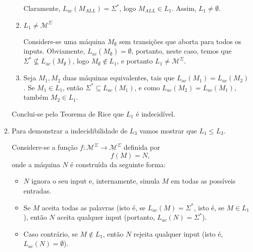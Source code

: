 \documentclass[a4paper,12pt]{article}
\begin{document}
\begin{enumerate}[label=\alph*)]
\begin{enumerate}[label=\arabic*)]
\begin{center}
    \end{center}

    Claramente, $L_{ac}(M_{ALL}) = \Sigma^*$, logo $M_{ALL} \in L_1$. Assim, $L_1 \neq \emptyset$.

    \vspace{0.3cm}
    \item \underline{$L_1 \neq \mathcal{M}^\Sigma$}

    Considere-se uma máquina $M_{\emptyset}$ sem transições que aborta para todos os inputs. Obviamente, $L_{ac}(M_{\emptyset}) = \emptyset$, portanto, neste caso, temos que $\Sigma^* \nsubseteq L_{ac}(M_{\emptyset})$, logo $M_{\emptyset} \notin L_1$, e portanto $L_1 \neq \mathcal{M}^\Sigma$.

    \vspace{0.3cm}
    \item Seja $M_1, M_2$ duas máquinas equivalentes, tais que $L_{ac}(M_1) = L_{ac}(M_2)$. Se $M_1 \in L_1$, então $\Sigma^* \subseteq L_{ac}(M_1)$, e como $L_{ac}(M_2) = L_{ac}(M_1)$, também $M_2 \in L_1$.

  \end{enumerate}

  Conclui-se pelo Teorema de Rice que $L_1$ é indecidível.


  \vspace{0.5cm}
  \item Para demonstrar a indecidibilidade de $L_3$ vamos mostrar que $L_1 \leq L_3$.

  Considere-se a função $f: \mathcal{M}^{\Sigma} \to \mathcal{M}^{\Sigma}$ definida por 
  $$
  f(M)=N,
  $$
  onde a máquina $N$ é construída da seguinte forma:

  \begin{itemize}
    \item $N$ ignora o seu input e, internamente, simula $M$ em todas as possíveis entradas.
    \item Se $M$ aceita todas as palavras (isto é, se $L_{ac}(M)=\Sigma^*$, isto é, se $M \in L_1$), então $N$ aceita qualquer input (portanto, $L_{ac}(N)=\Sigma^*$).
    \item Caso contrário, se $M \notin L_1$, então $N$ rejeita qualquer input (isto é, $L_{ac}(N)=\emptyset$).
  \end{itemize}


\end{enumerate}
\end{document}
